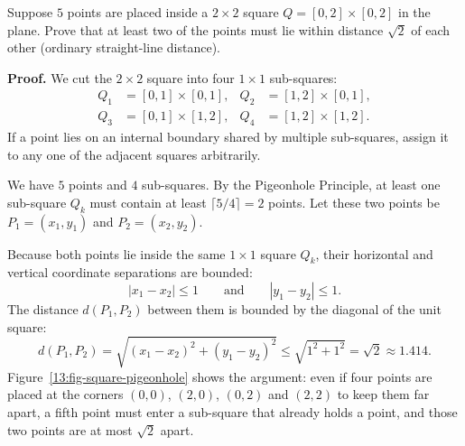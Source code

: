 \begin{example}
Suppose $5$ points are placed inside a $2 \times 2$ square $Q = [0, 2] \times [0, 2]$ in the plane. Prove that at least two of the points must lie within distance $\sqrt{2}$ of each other (ordinary straight-line distance).

\textbf{Proof.}
We cut the $2 \times 2$ square into four $1 \times 1$ sub-squares:
\begin{align*}
Q_1 &= [0, 1] \times [0, 1], & Q_2 &= [1, 2] \times [0, 1], \\
Q_3 &= [0, 1] \times [1, 2], & Q_4 &= [1, 2] \times [1, 2].
\end{align*}
If a point lies on an internal boundary shared by multiple sub-squares, assign it to any one of the adjacent squares arbitrarily. 

We have $5$ points and $4$ sub-squares. By the Pigeonhole Principle, at least one sub-square $Q_k$ must contain at least $\lceil 5/4 \rceil = 2$ points. Let these two points be $P_1 = (x_1, y_1)$ and $P_2 = (x_2, y_2)$.

Because both points lie inside the same $1 \times 1$ square $Q_k$, their horizontal and vertical coordinate separations are bounded:
\[
|x_1 - x_2| \le 1 \qquad \text{and} \qquad |y_1 - y_2| \le 1.
\]
The distance $d(P_1, P_2)$ between them is bounded by the diagonal of the unit square:
\[
d(P_1, P_2) = \sqrt{(x_1 - x_2)^2 + (y_1 - y_2)^2} \le \sqrt{1^2 + 1^2} = \sqrt{2} \approx 1.414.
\]
Figure~\ref{13:fig-square-pigeonhole} shows the argument: even if four points are placed at the corners $(0,0)$, $(2,0)$, $(0,2)$ and $(2,2)$ to keep them far apart, a fifth point must enter a sub-square that already holds a point, and those two points are at most $\sqrt{2}$ apart.
\end{example}

